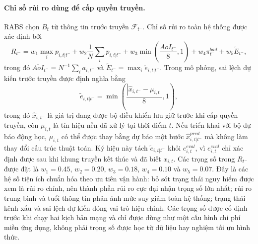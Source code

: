 \documentclass[10pt]{article}
\begin{document}
\paragraph{Chỉ số rủi ro dùng để cấp quyền truyền.}
RABS chọn $B_t$ từ thông tin trước truyền $\mathcal{F}_{t^-}$. Chỉ số rủi ro toàn hệ thống được xác định bởi
\begin{equation}
R_{t^-} = w_1\max_i p_{i,t|t^-} + w_2\frac{1}{N}\sum_i p_{i,t|t^-} + w_3\min\left(\frac{\overline{AoI}_{t^-}}{8},1\right) + w_4\pi^{bad}_{t^-} + w_5\widetilde E_{t^-},
\end{equation}
trong đó $\overline{AoI}_{t^-}=N^{-1}\sum_i a_{i,t^-}$ và $\widetilde E_{t^-}=\max_i\tilde e_{i,t|t^-}$. Trong mô phỏng, sai lệch dự kiến trước truyền được định nghĩa bằng
\begin{equation}
\tilde e_{i,t|t^-}=\min\left(\frac{|\hat{x}_{i,t^-}-\mu_{i,t}|}{8},1\right),
\end{equation}
trong đó $\hat{x}_{i,t^-}$ là giá trị đang được bộ điều khiển lưu giữ trước khi cấp quyền truyền, còn $\mu_{i,t}$ là tín hiệu nền đã xử lý tại thời điểm $t$. Nếu triển khai với bộ dự báo động học, $\mu_{i,t}$ có thể được thay bằng dự báo một bước $\hat{x}^{pred}_{i,t|t^-}$ mà không làm thay đổi cấu trúc thuật toán. Ký hiệu này tách $\tilde e_{i,t|t^-}$ khỏi $e^{eval}_{i,t}$, vì $e^{eval}_{i,t}$ chỉ xác định được sau khi khung truyền kết thúc và đã biết $x_{i,t}$. Các trọng số trong $R_{t^-}$ được đặt là $w_1=0.45$, $w_2=0.20$, $w_3=0.18$, $w_4=0.10$ và $w_5=0.07$. Đây là các hệ số tiện ích chuẩn hóa theo ưu tiên vận hành: bỏ sót trạng thái nguy hiểm được xem là rủi ro chính, nên thành phần rủi ro cực đại nhận trọng số lớn nhất; rủi ro trung bình và tuổi thông tin phản ánh mức suy giảm toàn hệ thống; trạng thái kênh xấu và sai lệch dự kiến đóng vai trò hiệu chỉnh. Các trọng số được cố định trước khi chạy hai kịch bản mạng và chỉ được dùng như một cấu hình chi phí miền ứng dụng, không phải trọng số được học từ dữ liệu hay nghiệm tối ưu hình thức.
\end{document}

